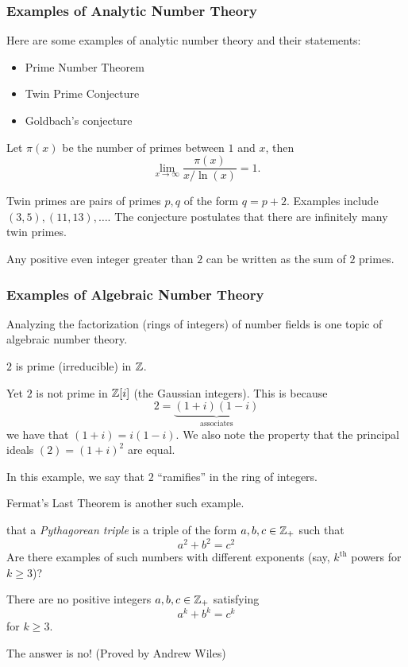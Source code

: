 \subsubsection{Examples of Analytic Number Theory}
Here are some examples of analytic number theory and their statements:
\begin{itemize}
    \item Prime Number Theorem
    \item Twin Prime Conjecture
    \item Goldbach's conjecture
\end{itemize}
\begin{theorem}
    Let $\pi(x)$ be the number of primes between $1$ and $x$, then
    \begin{equation*}
        \lim_{x\to\infty} \frac{\pi(x)}{x / \ln(x)} = 1.
    \end{equation*}
\end{theorem}
\begin{conjecture}
    Twin primes are pairs of primes $p, q$ of the form $q=p+2$. Examples include $(3, 5), (11, 13), \dots$. The conjecture postulates that there are infinitely many twin primes.
\end{conjecture}
\begin{conjecture}
    Any positive even integer greater than $2$ can be written as the sum of $2$ primes.
\end{conjecture}

\subsubsection{Examples of Algebraic Number Theory}
Analyzing the factorization (rings of integers) of number fields is one topic of algebraic number theory.
\begin{example}
    $2$ is prime (irreducible) in $\mathbb Z$.

    Yet $2$ is not prime in $\mathbb Z[i]$ (the Gaussian integers). This is because
    \[2 = \underbrace{(1+i)(1-i)}_{\text{associates}}\]
    we have that $(1+i) = i(1-i)$. We also note the property that the principal ideals $(2) = (1+i)^2$ are equal.

    In this example, we say that $2$ ``ramifies'' in the ring of integers.
\end{example}

Fermat's Last Theorem is another such example.

\recall that a \emph{Pythagorean triple} is a triple of the form $a, b, c\in \mathbb Z_+$ such that
\[a^2 + b^2 = c^2\]
Are there examples of such numbers with different exponents (say, $k^\mathrm{th}$ powers for $k\geq 3$)?
\begin{theorem}
    There are no positive integers $a, b, c\in \mathbb Z_+$ satisfying
    \[a^k + b^k = c^k\]
    for $k\geq 3$.
\end{theorem}
The answer is no! (Proved by Andrew Wiles)

